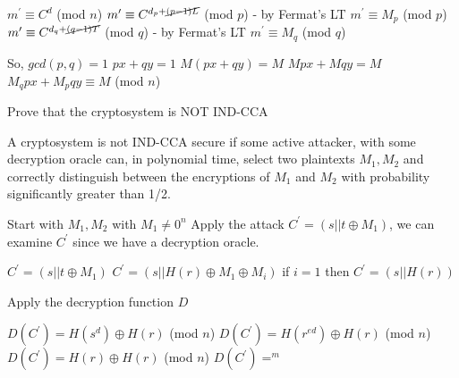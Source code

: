 \documentclass{assignment}
\begin{document}
\begin{problemlist}
\begin{problem}
\begin{enumerate}
$m^{\prime} \equiv C^d$ (mod $n$) \newline
$m^{\prime} \equiv C^{d_p + \cancel{(p - 1)L}}$ (mod $p$) - by Fermat's LT \newline
$m^{\prime} \equiv M_p$ (mod $p$) \newline
$m^{\prime} \equiv C^{d_q + \cancel{(q - 1)T}}$ (mod $q$) - by Fermat's LT \newline
$m^{\prime} \equiv M_q$ (mod $q$)\newline

So, $gcd(p,q) = 1$ \newline
$px + qy = 1$ \newline
$M(px + qy) = M$ \newline
$Mpx + Mqy = M$ \newline
$M_qpx + M_pqy \equiv M$ (mod $n$) \newline

 

\end{enumerate}


\clearpage
\end{problem}

\begin{problem}
\pbitem

Prove that the cryptosystem is NOT IND-CCA

A cryptosystem is not IND-CCA secure if some active attacker, with some decryption oracle can, in polynomial time, select two plaintexts $M_1, M_2$ and correctly distinguish between the encryptions of $M_1$ and $M_2$ with probability significantly greater than 1/2.

Start with $M_1,M_2$ with $M_1 \neq 0^n$ \newline
Apply the attack $C^{\prime} =  (s||t \oplus M_1)$, we can examine $C^{\prime}$ since we have a decryption oracle. \newline

$C^{\prime} =  (s||t \oplus M_1)$ \newline
$C^{\prime} =  (s||H(r) \oplus M_1\oplus M_i)$ \newline
if $i=1$ then $C^{\prime} =  (s||H(r))$ \newline

Apply the decryption function $D$ \newline

$D(C^{\prime}) = H(s^d) \oplus H(r)$ (mod $n$)\newline
$D(C^{\prime}) = H(r^{ed}) \oplus H(r)$ (mod $n$) \newline
$D(C^{\prime}) = H(r) \oplus H(r)$ (mod $n$) \newline
$D(C^{\prime}) = ^m$ \newline


\end{problem}
\end{problemlist}
\end{document}
